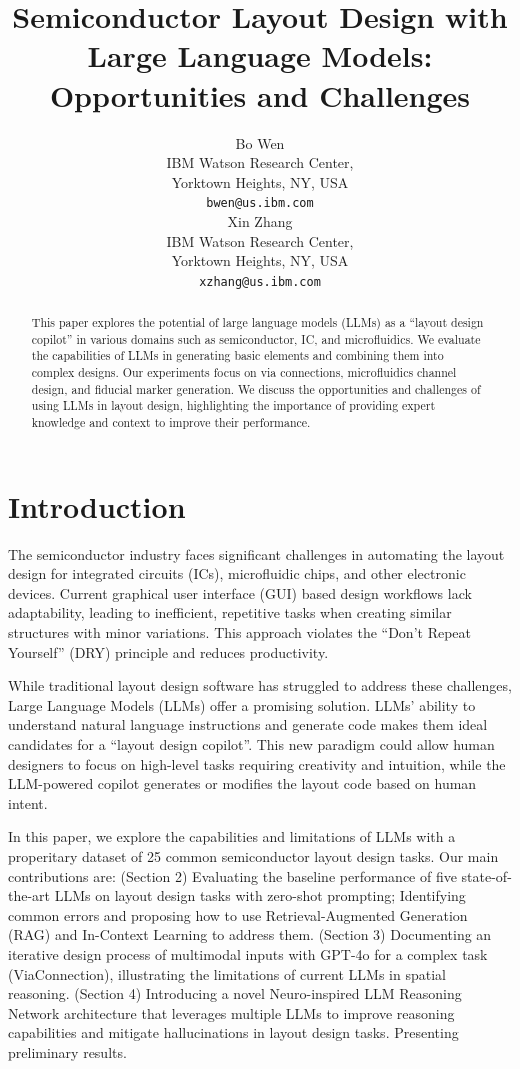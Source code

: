 \documentclass{article}
\title{Semiconductor Layout Design with Large Language Models: Opportunities and Challenges}
\author{%
  Bo Wen\\
  IBM Watson Research Center, \\
  Yorktown Heights, NY, USA \\
  \texttt{bwen@us.ibm.com} \\
  \And
  Xin Zhang\\
  IBM Watson Research Center, \\
  Yorktown Heights, NY, USA \\
  \texttt{xzhang@us.ibm.com} \\
}
\begin{document}
\maketitle

\begin{abstract}
  This paper explores the potential of large language models (LLMs) as a ``layout design copilot'' in various domains such as semiconductor, IC, and microfluidics. We evaluate the capabilities of LLMs in generating basic elements and combining them into complex designs. Our experiments focus on via connections, microfluidics channel design, and fiducial marker generation. We discuss the opportunities and challenges of using LLMs in layout design, highlighting the importance of providing expert knowledge and context to improve their performance.
\end{abstract}

\section{Introduction}
The semiconductor industry faces significant challenges in automating the layout design for integrated circuits (ICs), microfluidic chips, and other electronic devices. Current graphical user interface (GUI) based design workflows lack adaptability, leading to inefficient, repetitive tasks when creating similar structures with minor variations.\cite{Greengard2024-hx} This approach violates the ``Don't Repeat Yourself'' (DRY) principle and reduces productivity.

While traditional layout design software has struggled to address these challenges, Large Language Models (LLMs) offer a promising solution. LLMs' ability to understand natural language instructions and generate code makes them ideal candidates for a ``layout design copilot''. This new paradigm could allow human designers to focus on high-level tasks requiring creativity and intuition, while the LLM-powered copilot generates or modifies the layout code based on human intent.

In this paper, we explore the capabilities and limitations of LLMs with a properitary dataset of 25 common semiconductor layout design tasks. Our main contributions are: 
(Section 2) Evaluating the baseline performance of five state-of-the-art LLMs on layout design tasks with zero-shot prompting; Identifying common errors and proposing how to use Retrieval-Augmented Generation (RAG) and In-Context Learning to address them. 
(Section 3) Documenting an iterative design process of multimodal inputs with GPT-4o for a complex task (ViaConnection), illustrating the limitations of current LLMs in spatial reasoning. 
(Section 4) Introducing a novel Neuro-inspired LLM Reasoning Network architecture that leverages multiple LLMs to improve reasoning capabilities and mitigate hallucinations in layout design tasks. Presenting preliminary results. 
\end{document}
